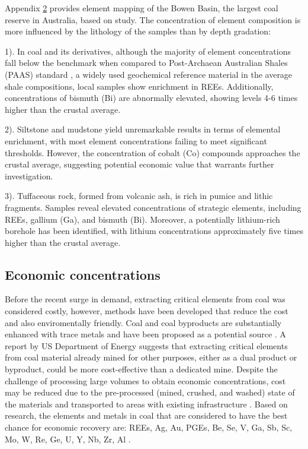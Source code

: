 \documentclass[11pt,a4paper,]{article}
\begin{document}
Appendix \href{\%7B\#appendix-two\%7D}{2} provides element mapping of the Bowen Basin, the largest coal reserve in Australia, based on \textcite{Hodgkinson2020} study. The concentration of element composition is more influenced by the lithology of the samples than by depth gradation:

1). In coal and its derivatives, although the majority of element concentrations fall below the benchmark when compared to Post-Archaean Australian Shales (PAAS) standard \autocite{McLennan2011}, a widely used geochemical reference material in the average shale compositions, local samples show enrichment in REEs. Additionally, concentrations of bismuth (Bi) are abnormally elevated, showing levels 4-6 times higher than the crustal average.

2). Siltstone and mudstone yield unremarkable results in terms of elemental enrichment, with most element concentrations failing to meet significant thresholds. However, the concentration of cobalt (Co) compounds approaches the crustal average, suggesting potential economic value that warrants further investigation.

3). Tuffaceous rock, formed from volcanic ash, is rich in pumice and lithic fragments. Samples reveal elevated concentrations of strategic elements, including REEs, gallium (Ga), and bismuth (Bi). Moreover, a potentially lithium-rich borehole has been identified, with lithium concentrations approximately five times higher than the crustal average.

\subsection{Economic concentrations}\label{economic-concentrations}

Before the recent surge in demand, extracting critical elements from coal was considered costly, however, methods have been developed that reduce the cost and also enviromentally friendly. Coal and coal byproducts are substantially enhanced with trace metals and have been proposed as a potential source \autocite{Eterigho2021}. A report by US Department of Energy suggests that extracting critical elements from coal material already mined for other purposes, either as a dual product or byproduct, could be more cost-effective than a dedicated mine. Despite the challenge of processing large volumes to obtain economic concentrations, cost may be reduced due to the pre-processed (mined, crushed, and washed) state of the materials and transported to areas with existing infrastructure \autocite{usde2017,Hodgkinson2021}. Based on research, the elements and metals in coal that are considered to have the best chance for economic recovery are: REEs, Ag, Au, PGEs, Be, Se, V, Ga, Sb, Sc, Mo, W, Re, Ge, U, Y, Nb, Zr, Al \autocite{DAI2018155}.
\end{document}
